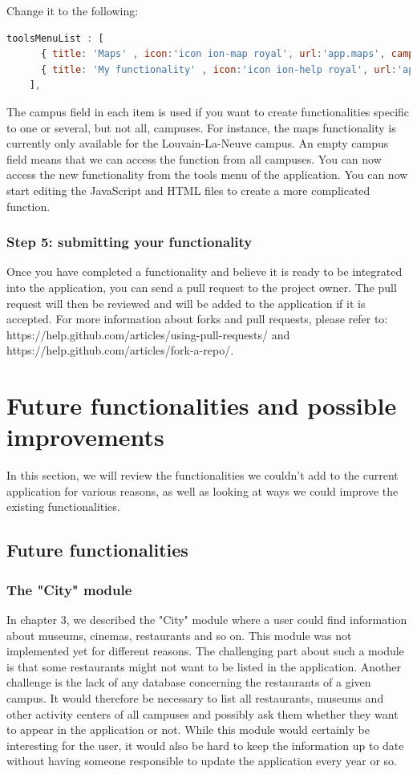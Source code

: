 \documentclass{eplmastersthesis}
\begin{document}
Change it to the following:
\begin{lstlisting}[language=JavaScript]
   toolsMenuList : [
      { title: 'Maps' , icon:'icon ion-map royal', url:'app.maps', campus:['Louvain-la-Neuve']},
      { title: 'My functionality' , icon:'icon ion-help royal', url:'app.myfunctionality', campus:[]}
    ],
\end{lstlisting}
The campus field in each item is used if you want to create functionalities specific to one or several, but not all, campuses. For instance, the maps functionality is currently only available for the Louvain-La-Neuve campus. An empty campus field means that we can access the function from all campuses.
You can now access the new functionality from the tools menu of the application. You can now start editing the JavaScript and HTML files to create a more complicated function.
\subsubsection{Step 5: submitting your functionality}
Once you have completed a functionality and believe it is ready to be integrated into the application, you can send a pull request to the project owner. The pull request will then be reviewed and will be added to the application if it is accepted. For more information about forks and pull requests, please refer to: https://help.github.com/articles/using-pull-requests/ and https://help.github.com/articles/fork-a-repo/.
\section{Future functionalities and possible improvements}
In this section, we will review the functionalities we couldn't add to the current application for various reasons, as well as looking at ways we could improve the existing functionalities.
\subsection{Future functionalities}
\subsubsection{The "City" module}
In chapter 3, we described the "City" module where a user could find information about museums, cinemas, restaurants and so on. This module was not implemented yet for different reasons. The challenging part about such a module is that some restaurants might not want to be listed in the application. Another challenge is the lack of any database concerning the restaurants of a given campus. It would therefore be necessary to list all restaurants, museums and other activity centers of all campuses and possibly ask them whether they want to appear in the application or not.
While this module would certainly be interesting for the user, it would also be hard to keep the information up to date without having someone responsible to update the application every year or so.
\end{document}
